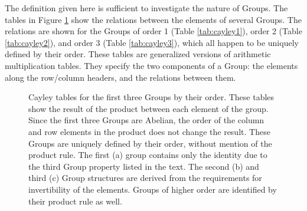 The definition given here is sufficient to investigate the nature of Groups. The tables in Figure \ref{tab:cayley} show the relations between the elements of several Groups.
The relations are shown for the Groups of order 1 (Table \ref{tab:cayley1}), order 2 (Table \ref{tab:cayley2}), and order 3 (Table \ref{tab:cayley3}), which all happen to be uniquely defined by their order.
These tables are generalized versions of arithmetic multiplication tables.
They specify the two components of a Group: the elements along the row/column headers, and the relations between them. 

\begin{figure}[h!]
\captionsetup[subfigure]{position=b}
\centering
{}
\caption{Cayley tables for the first three Groups by their order. These tables show the result of the product between each element of the group. Since the first three Groups are Abelian, the order of the column and row elements in the product does not change the result. These Groups are uniquely defined by their order, without mention of the product rule. The first (a) group contains only the identity due to the third Group property listed in the text. The second (b) and third (c) Group structures are derived from the requirements for invertibility of the elements. Groups of higher order are identified by their product rule as well.}
\label{tab:cayley}
\end{figure}

